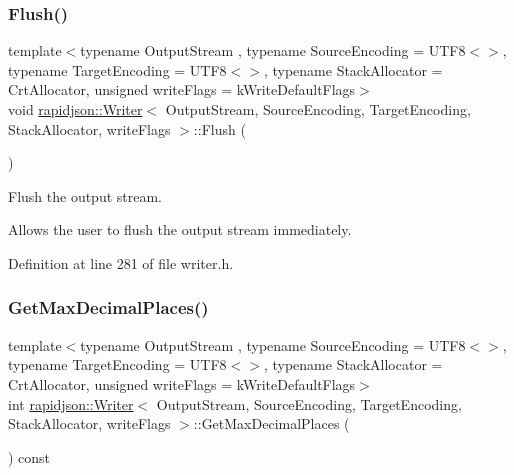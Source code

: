 \subsubsection{\texorpdfstring{Flush()}{Flush()}}
{\footnotesize\ttfamily template$<$typename Output\+Stream , typename Source\+Encoding  = U\+T\+F8$<$$>$, typename Target\+Encoding  = U\+T\+F8$<$$>$, typename Stack\+Allocator  = Crt\+Allocator, unsigned write\+Flags = k\+Write\+Default\+Flags$>$ \\
void \mbox{\hyperlink{classrapidjson_1_1_writer}{rapidjson\+::\+Writer}}$<$ Output\+Stream, Source\+Encoding, Target\+Encoding, Stack\+Allocator, write\+Flags $>$\+::Flush (\begin{DoxyParamCaption}{ }\end{DoxyParamCaption})}



Flush the output stream. 

Allows the user to flush the output stream immediately. 

Definition at line 281 of file writer.\+h.


\begin{DoxyCode}{0}

\end{DoxyCode}
\mbox{\label{classrapidjson_1_1_writer_aa436d23d8227c270a9a5297a6dbc0674}} 
\subsubsection{\texorpdfstring{GetMaxDecimalPlaces()}{GetMaxDecimalPlaces()}}
{\footnotesize\ttfamily template$<$typename Output\+Stream , typename Source\+Encoding  = U\+T\+F8$<$$>$, typename Target\+Encoding  = U\+T\+F8$<$$>$, typename Stack\+Allocator  = Crt\+Allocator, unsigned write\+Flags = k\+Write\+Default\+Flags$>$ \\
int \mbox{\hyperlink{classrapidjson_1_1_writer}{rapidjson\+::\+Writer}}$<$ Output\+Stream, Source\+Encoding, Target\+Encoding, Stack\+Allocator, write\+Flags $>$\+::Get\+Max\+Decimal\+Places (\begin{DoxyParamCaption}{ }\end{DoxyParamCaption}) const}



